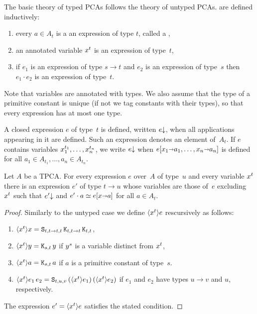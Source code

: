 The basic theory of typed PCAs follows the theory of untyped PCAs.
 are defined inductively:
%
\begin{enumerate}
\item every $a \in A_t$ is a an expression of type $t$, called a
  ,
\item an annotated variable $x^{t}$ is an expression of type~$t$,
\item if $e_1$ is an expression of type $s \to t$ and $e_2$ is an
  expression of type~$s$ then $e_1 \cdot e_2$ is an expression of
  type~$t$.
\end{enumerate}
%
Note that variables are annotated with types. We also
assume that the type of a primitive constant is unique (if not we tag
constants with their types), so that every expression has at most one type.

A closed expression $e$ of type~$t$ is defined, written $e{\downarrow}$,
when all applications appearing in it are defined. Such an expression
denotes an element of~$A_t$. If $e$ contains variables
$x_1^{t_1}, \ldots, x_n^{t_n}$, we write $e{\downarrow}$
when $e[x_1 {\shortrightarrow} a_1, \ldots, x_n {\shortrightarrow} a_n]$ is defined
for all $a_1 \in A_{t_1}, \ldots, a_n \in A_{t_n}$.

\begin{theorem}
  Let $A$ be a TPCA. For every expression $e$ over~$A$ of type~$u$ and
  every variable $x^{t}$ there is an expression $e'$ of type $t
  \to u$ whose variables are those of~$e$ excluding~$x^{t}$
  such that $e'{\downarrow}$ and $e' \cdot a \simeq e[x {\shortrightarrow}
    a]$ for all $a \in A_t$.
\end{theorem}

\begin{proof}
  Similarly to the untyped case we define $\langle x^{t} \rangle e$ rescursively as follows:
  \begin{enumerate}
  \item $\langle x^{t} \rangle x = \mathtt{S}_{t,t \to t,t} \, \mathtt{K}_{t,t \to
      t} \, \mathtt{K}_{t,t}$,
  \item $\langle x^{t} \rangle y = \mathtt{K}_{s,t}\, y$ if $y^{s}$ is a
    variable distinct from $x^{t}$,
  \item $\langle x^{t} \rangle a = \mathtt{K}_{s,t} \, a$ if $a$ is a primitive
    constant of type~$s$.
  \item $\langle x^{t} \rangle {e_1\, e_2} = \mathtt{S}_{t,u,v}\,
    (\langle x^{t} \rangle e_1) \, (\langle x^{t} \rangle e_2)$ if $e_1$ and
    $e_2$ have types $u \to v$ and $u$, respectively.
  \end{enumerate}
  The expression $e' = \langle x^{t} \rangle e$ satisfies the stated condition.
\end{proof}

